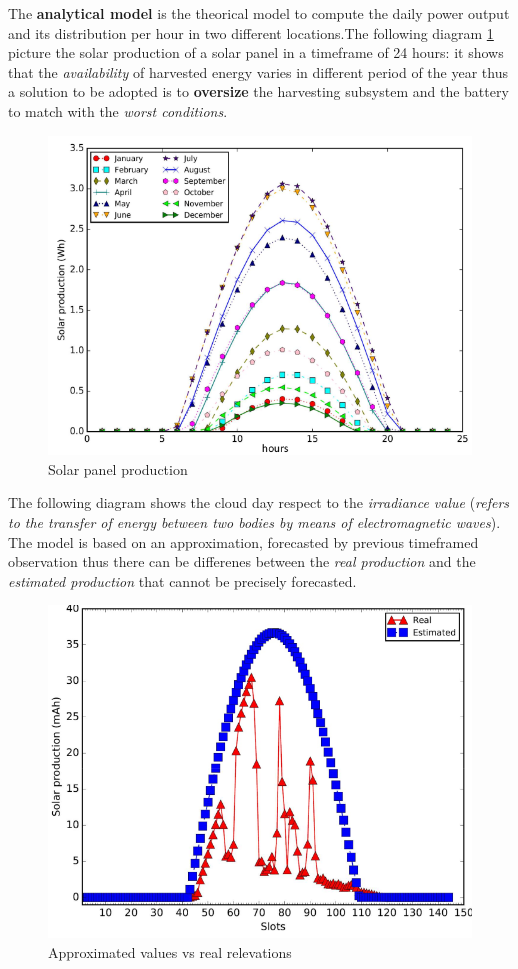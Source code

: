\documentclass[10pt,a4paper]{report}
\theoremstyle{definition}
\begin{document}
The \textbf{analytical model} is the theorical model to compute the daily power output and its distribution per hour in two different locations.The following diagram \ref{panel-prod} picture the solar production of a solar panel in a timeframe of 24 hours: it shows that the \textit{availability} of harvested energy varies in different period of the year thus a solution to be adopted is to \textbf{oversize} the harvesting subsystem and the battery to match with the \textit{worst conditions}.
\begin{figure}[h]
	\centering\includegraphics[scale=0.40]{images/Pasted image 20230506083409.png}
	\caption{Solar panel production}
	\label{panel-prod}
\end{figure}


The following diagram shows the cloud day respect to the \textit{irradiance value} (\textit{refers to the transfer of energy between two bodies by means of electromagnetic waves}).
The model is based on an approximation, forecasted by previous timeframed observation thus there can be differenes between the \textit{real production} and the \textit{estimated production} that cannot be precisely forecasted. 
\begin{figure}[h]
	\centering\includegraphics[scale=0.40]{images/Pasted image 20230506084028.png}
	\caption{Approximated values vs real relevations}
\end{figure}
\end{document}

